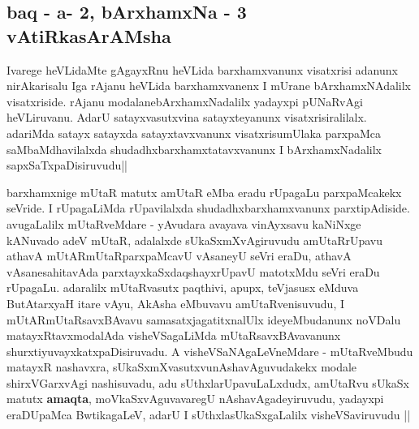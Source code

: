 \begin{center}

\section*{baq - a- 2, bArxhamxNa - 3 vAtiRkasArAMsha}

\bigskip

\end{center}

\begin{artha}
 Ivarege heVLidaMte gAgayxRnu heVLida barxhamxvanunx visatxrisi
 adanunx nirAkarisalu Iga rAjanu heVLida barxhamxvanenx I mUrane
 bArxhamxNAdalilx visatxriside. rAjanu modalanebArxhamxNadalilx
 yadayxpi pUNaRvAgi heVLiruvanu. AdarU satayxvasutxvina satayxteyanunx
 visatxrisiralilalx. adariMda satayx satayxda satayxtavxvanunx
 visatxrisumUlaka parxpaMca saMbaMdhavilalxda
 shudadhxbarxhamxtatavxvanunx I bArxhamxNadalilx sapxSaTxpaDisiruvudu||
\end{artha}

\begin{center}


\end{center}


\begin{artha}
barxhamxnige mUtaR matutx amUtaR eMba eradu rUpagaLu parxpaMcakekx
seVride. I rUpagaLiMda rUpavilalxda shudadhxbarxhamxvanunx
parxtipAdiside. avugaLalilx mUtaRveMdare - yAvudara avayava vinAyxsavu
kaNiNxge kANuvado adeV mUtaR, adalalxde sUkaSxmXvAgiruvudu
amUtaRrUpavu athavA mUtARmUtaRparxpaMcavU vAsaneyU seVri eraDu, athavA
vAsanesahitavAda parxtayxkaSxdaqshayxrUpavU matotxMdu seVri eraDu
rUpagaLu. adaralilx  mUtaRvasutx paqthivi, apupx, teVjasusx eMduva
ButAtarxyaH itare vAyu, AkAsha eMbuvavu amUtaRvenisuvudu, I
mUtARmUtaRsavxBAvavu samasatxjagatitxnalUlx ideyeMbudanunx noVDalu
matayxRtavxmodalAda visheVSagaLiMda mUtaRsavxBAvavanunx
shurxtiyuvayxkatxpaDisiruvadu. A visheVSaNAgaLeVneMdare - mUtaRveMbudu
matayxR nashavxra, sUkaSxmXvasutxvunAshavAguvudakekx modale
shirxVGarxvAgi nashisuvadu, adu sUthxlarUpavuLaLxdudx, amUtaRvu sUkaSx
matutx \textbf{amaqta}, moVkaSxvAguvavaregU nAshavAgadeyiruvudu,
yadayxpi eraDUpaMca BwtikagaLeV, adarU I sUthxlasUkaSxgaLalilx
visheVSaviruvudu ||
\end{artha}

